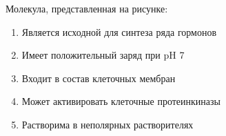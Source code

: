 
Молекула, представленная на рисунке:


\begin{enumerate}
    \item Является исходной для синтеза ряда гормонов
    \item Имеет положительный заряд при pH 7
    \item Входит в состав клеточных мембран
    \item Может активировать клеточные протеинкиназы
    \item Растворима в неполярных растворителях
\end{enumerate}

\explanationSection

